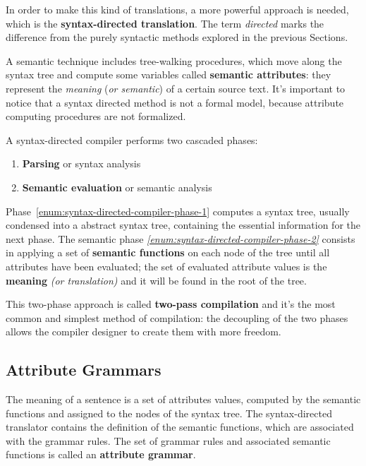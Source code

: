 \documentclass[english]{article}
\begin{document}
In order to make this kind of translations, a more powerful approach is needed, which is the \textbf{syntax-directed translation}.
The term \textit{directed} marks the difference from the purely syntactic methods explored in the previous Sections.

A semantic technique includes tree-walking procedures, which move along the syntax tree and compute some variables called \textbf{semantic attributes}:
they represent the \textit{meaning} (\textit{or semantic}) of a certain source text.
It's important to notice that a syntax directed method is not a formal model, because attribute computing procedures are not formalized.

A syntax-directed compiler performs two cascaded phases:

\begin{enumerate}[label=\arabic*., ref=(\arabic*)]
  \item\label{enum:syntax-directed-compiler-phase-1} \textbf{Parsing} or syntax analysis
  \item\label{enum:syntax-directed-compiler-phase-2} \textbf{Semantic evaluation} or semantic analysis
\end{enumerate}

Phase~\ref{enum:syntax-directed-compiler-phase-1} computes a syntax tree, usually condensed into a abstract syntax tree, containing the essential information for the next phase.
The semantic phase \textit{\ref{enum:syntax-directed-compiler-phase-2}} consists in applying a set of \textbf{semantic functions} on each node of the tree until all attributes have been evaluated;
the set of evaluated attribute values is the \textbf{meaning} \textit{(or translation)} and it will be found in the root of the tree.

This two-phase approach is called \textbf{two-pass compilation} and it's the most common and simplest method of compilation:
the decoupling of the two phases allows the compiler designer to create them with more freedom.

\subsection{Attribute Grammars}

The meaning of a sentence is a set of attributes values, computed by the semantic functions and assigned to the nodes of the syntax tree.
The syntax-directed translator contains the definition of the semantic functions, which are associated with the grammar rules.
The set of grammar rules and associated semantic functions is called an \textbf{attribute grammar}.
\end{document}
